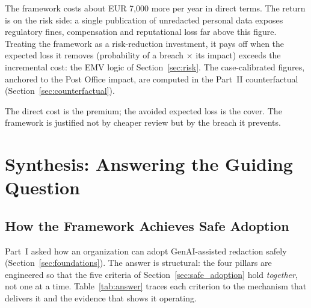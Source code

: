\documentclass[12pt,a4paper]{article}
\begin{document}
The framework costs about EUR 7,000 more per year in direct terms. The return is on the risk side: a single publication of unredacted personal data exposes regulatory fines, compensation and reputational loss far above this figure. Treating the framework as a risk-reduction investment, it pays off when the expected loss it removes (probability of a breach $\times$ its impact) exceeds the incremental cost: the EMV logic of Section~\ref{sec:risk}. The case-calibrated figures, anchored to the Post Office impact, are computed in the Part~II counterfactual (Section~\ref{sec:counterfactual}).

\begin{principlebox}
The direct cost is the premium; the avoided expected loss is the cover. The framework is justified not by cheaper review but by the breach it prevents.
\end{principlebox}

\section{Synthesis: Answering the Guiding Question}
\label{sec:synthesis}

\subsection{How the Framework Achieves Safe Adoption}

Part~I asked how an organization can adopt GenAI-assisted redaction safely (Section~\ref{sec:foundations}). The answer is structural: the four pillars are engineered so that the five criteria of Section~\ref{sec:safe_adoption} hold \emph{together}, not one at a time. Table~\ref{tab:answer} traces each criterion to the mechanism that delivers it and the evidence that shows it operating.
\end{document}
